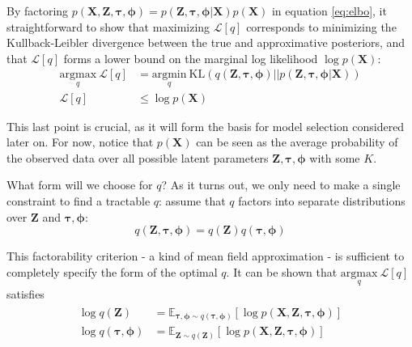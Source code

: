 \documentclass{article}
\let\vec\boldsymbol
\begin{document}
By factoring $p \left( \vec{X}, \vec{Z}, \boldsymbol{\tau}, \boldsymbol{\phi} \right) = p \left( \vec{Z}, \boldsymbol{\tau}, \boldsymbol{\phi} | \vec{X} \right) p \left( \vec{X} \right)$ in equation \ref{eq:elbo}, it straightforward to show that maximizing $\mathcal{L} [q]$ corresponds to minimizing the Kullback-Leibler divergence between the true and approximative posteriors, and that $\mathcal{L}[q]$ forms a lower bound on the marginal log likelihood $\log p (\vec{X})$:
\begin{align*}
    \underset{q}{\text{argmax}} \: \mathcal{L}[q] &= \underset{q}{\text{argmin}} \: \text{KL} \left( q(\vec{Z}, \boldsymbol{\tau}, \boldsymbol{\phi}) || p (\vec{Z}, \boldsymbol{\tau}, \boldsymbol{\phi} | \vec{X} ) \right) \\
    \mathcal{L}[q] &\leq \log p (\vec{X})
\end{align*}

This last point is crucial, as it will form the basis for model selection considered later on. For now, notice that $p(\vec{X})$ can be seen as the average probability of the observed data over all possible latent parameters $\vec{Z}, \boldsymbol{\tau}, \boldsymbol{\phi}$ with some $K$. \newline

What form will we choose for $q$? As it turns out, we only need to make a
single constraint to find a tractable $q$: assume that $q$ factors into
separate distributions over $\vec{Z}$ and $\boldsymbol{\tau}, \boldsymbol{\phi}$:
\[
    q \left( \vec{Z}, \boldsymbol{\tau}, \boldsymbol{\phi} \right) = q \left( \vec{Z} \right) q \left( \boldsymbol{\tau}, \boldsymbol{\phi} \right)
\]

This factorability criterion - a kind of mean field approximation - is sufficient
to completely specify the form of the optimal $q$. It can be shown \cite{bishop2006}
that $\underset{q}{\text{argmax}} \: \mathcal{L}[q]$ satisfies
\begin{align}\begin{split}\label{eq:em_equations}
    \log q \left( \vec{Z} \right) &= \mathbb{E}_{\boldsymbol{\tau}, \boldsymbol{\phi} \sim q (\boldsymbol{\tau}, \boldsymbol{\phi})} \left[ \log p \left( \vec{X}, \vec{Z}, \boldsymbol{\tau}, \boldsymbol{\phi} \right) \right] \\
    \log q \left( \boldsymbol{\tau}, \boldsymbol{\phi} \right) &= \mathbb{E}_{\vec{Z} \sim q(\vec{Z})} \left[ \log p \left( \vec{X}, \vec{Z}, \boldsymbol{\tau}, \boldsymbol{\phi} \right) \right]
\end{split}\end{align}
\end{document}
